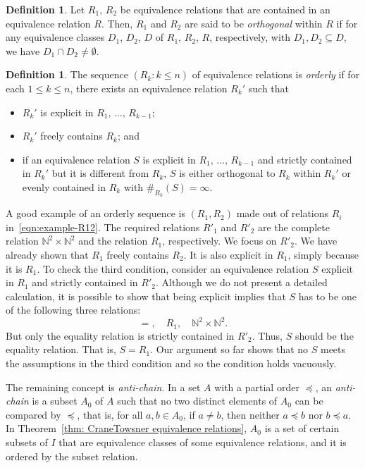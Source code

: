 \documentclass[10pt]{amsart}
\theoremstyle{definition}\newtheorem{defi}[theo]{Definition}\newtheorem{rema}[theo]{Remark}\newtheorem{exam}[theo]{Example}\newtheorem{exem}[theo]{Example}\newtheorem{nota}[theo]{Notation}
\newcommand*\N{\mathbb{N}}
\begin{document}
\begin{defi}\label{def: orthogonal}
Let $R_1$, $R_2$ be equivalence relations that are contained in an equivalence relation $R$. Then, $R_1$ and $R_2$ are said to be \emph{orthogonal} within $R$ if for any equivalence classes $D_1$, $D_2$, $D$ of $R_1$, $R_2$, $R$, respectively, with $D_1, D_2 \subseteq D$, we have $D_1 \cap D_2 \neq \emptyset$.
\end{defi}
\goodbreak
\begin{defi}\label{def: orderly}
The sequence $(R_k : k \leq n)$ of equivalence relations is \emph{orderly} if for each $1\leq k \leq n$, there exists an equivalence relation $R_k'$ such that
\begin{itemize}
\item $R_k'$ is explicit in $R_1,\,\ldots,\,R_{k-1}$;
\item $R_k'$ freely contains $R_k$; and
\item if an equivalence relation $S$ is explicit in $R_1,\,\ldots,\,R_{k-1}$ and strictly contained in $R_k'$ but it is different from $R_k$, $S$ is either orthogonal to $R_k$ within $R_k'$ or evenly contained in $R_k$ with $\#_{R_k}(S) = \infty$.
\end{itemize}
\end{defi}

A good example of an orderly sequence is $(R_1,R_2)$ made out of relations $R_i$ in~\eqref{eqn:example-R12}. The required relations $R'_1$ and $R'_2$ are the complete relation $\mathbb{N}^2 \times \mathbb{N}^2$ and the relation $R_1$, respectively. We focus on $R'_2$. We have already shown that $R_1$ freely contains $R_2$. It is also explicit in $R_1$, simply because it is $R_1$. To check the third condition, consider an equivalence relation $S$ explicit in $R_1$ and strictly contained in $R'_2$. Although we do not present a detailed calculation, it is possible to show that being explicit implies that $S$ has to be one of the following three relations:
\[
=,\quad R_1,\quad
\N^2 \times \N^2.
\]
But only the equality relation is strictly contained in $R'_2$. Thus, $S$ should be the equality relation. That is, $S = R_1$. Our argument so far shows that no $S$ meets the assumptions in the third condition and so the condition holds vacuously.


The remaining concept is \emph{anti-chain}. In a set $A$ with a partial order $\preceq$, an \emph{anti-chain} is a subset $A_0$ of $A$ such that no two distinct elements of $A_0$ can be compared by $\preceq$, that is, for all $a,b \in A_0$, if $a \neq b$, then neither $a\preceq b$ nor $b \preceq a$. In Theorem~\ref{thm: CraneTowsner equivalence relations}, $A_0$ is a set of certain subsets of $I$ that are equivalence classes of some equivalence relations, and it is ordered by the subset relation.
\end{document}

